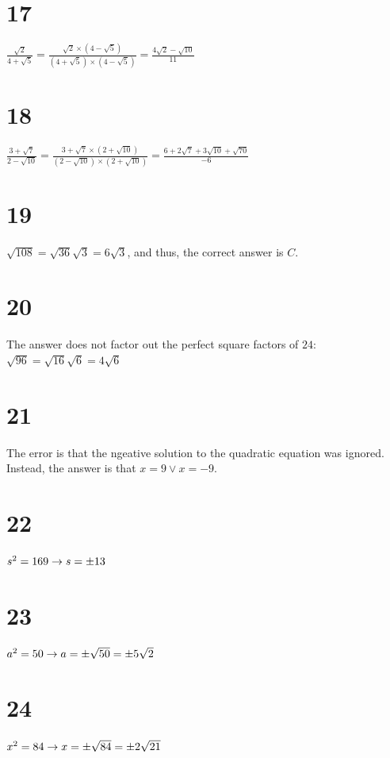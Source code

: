 \documentclass{article}
\theoremstyle{definition}
\begin{document}
\section*{17}
$\frac{\sqrt{2}}{4+\sqrt{5}}=\frac{\sqrt{2}\times(4-\sqrt{5})}{(4+\sqrt{5})\times (4-\sqrt{5})}=
\frac{4\sqrt{2}-\sqrt{10}}{11}$

\section*{18}
$\frac{3+\sqrt{7}}{2-\sqrt{10}}=\frac{3+\sqrt{7}\times(2+\sqrt{10})}{(2-\sqrt{10})\times (2+\sqrt{10})}=
\frac{6+2\sqrt{7}+3\sqrt{10}+\sqrt{70}}{-6}$

\section*{19}
$\sqrt{108}=\sqrt{36}\sqrt{3}=6\sqrt{3}$, and thus, the correct answer is $C$.

\section*{20}
The answer does not factor out the perfect square factors of $24$:\newline
$\sqrt{96}=\sqrt{16}\sqrt{6}=4\sqrt{6}$

\section*{21}
The error is that the ngeative solution to the quadratic equation was ignored. Instead, the answer is that $x=9\vee x=-9$.

\section*{22}
$s^2=169\newline\rightarrow s=\pm 13$

\section*{23}
$a^2=50\newline\rightarrow a=\pm\sqrt{50}=\pm 5\sqrt{2}$

\section*{24}
$x^2=84\newline\rightarrow x=\pm\sqrt{84}=\pm 2\sqrt{21}$
\end{document}
